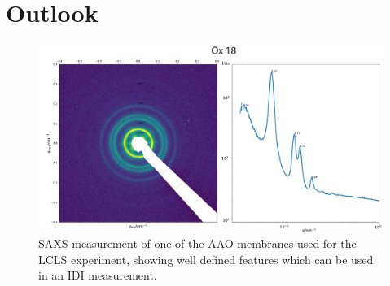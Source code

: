 \section{Outlook}
\begin{figure}[h!]
	\centering
	\includegraphics[width=0.8\linewidth]{images/ox18.pdf}
	\caption[SAXS of AAO membrane sample]{SAXS measurement of one of the AAO membranes used for the LCLS experiment, showing well defined features which can be used in an IDI measurement.}
	\label{fig:kosselgaasmean}
\end{figure}

